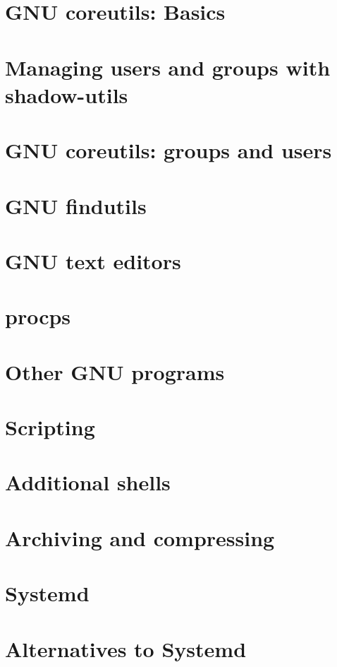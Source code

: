 \documentclass[oneside]{book}
\begin{document}
\part{GNU coreutils: Basics}















\part{Managing users and groups with shadow-utils}






\part{GNU coreutils: groups and users}


\part{GNU findutils}


\part{GNU text editors}



\part{procps}


\part{Other GNU programs}






\part{Scripting}



\part{Additional shells}





\part{Archiving and compressing}




\part{Systemd}


\part{Alternatives to Systemd}

\end{document}
